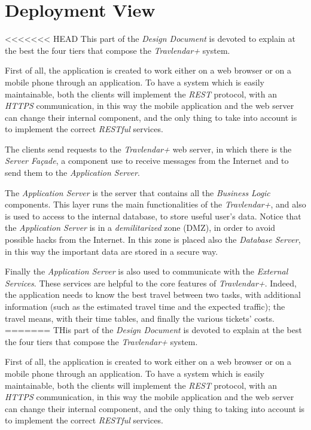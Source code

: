 \section{Deployment View}
<<<<<<< HEAD
This part of the \emph{Design Document} is devoted to explain at the best the four tiers that compose the \emph{Travlendar+} system.

First of all, the application is created to work either on a web browser or on a mobile phone through an application.
To have a system which is easily maintainable, both the clients will implement the \emph{REST} protocol, with an \emph{HTTPS} communication, in this way the mobile application and the web server can change their internal component, and the only thing to take into account is to implement the correct \emph{RESTful} services.

The clients send requests to the \emph{Travlendar+} web server, in which there is the \emph{Server Façade}, a component use to receive messages from the Internet and to send them to the \emph{Application Server}.

The \emph{Application Server} is the server that contains all the \emph{Business Logic} components. This layer runs the main functionalities of the \emph{Travlendar+}, and also is used to access to the internal database, to store useful user's data. Notice that the \emph{Application Server} is in a \emph{demilitarized} zone (DMZ), in order to avoid possible hacks from the Internet. In this zone is placed also the \emph{Database Server}, in this way the important data are stored in a secure way.

Finally the \emph{Application Server} is also used to communicate with the \emph{External Services}. These services are helpful to the core features of \emph{Travlendar+}. Indeed, the application needs to know the best travel between two tasks, with additional information (such as the estimated travel time and the expected traffic); the travel means, with their time tables, and finally the various tickets' costs.
=======
THis part of the \emph{Design Document} is devoted to explain at the best the four tiers that compose the \emph{Travlendar+} system.

First of all, the application is created to work either on a web browser or on a mobile phone through an application.
To have a system which is easily maintainable, both the clients will implement the \emph{REST} protocol, with an \emph{HTTPS} communication, in this way the mobile application and the web server can change their internal component, and the only thing to taking into account is to implement the correct \emph{RESTful} services.

